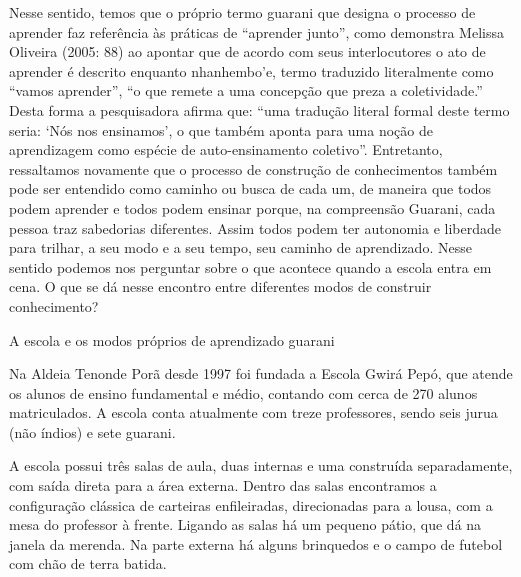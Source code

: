 \documentclass{article}
\begin{document}
Nesse sentido, temos que o pr\'oprio termo guarani que designa o
processo de aprender faz refer\^encia \`as pr\'aticas de
{\textquotedblleft}aprender junto{\textquotedblright}, como demonstra 
Melissa Oliveira (2005: 88) ao apontar que de acordo com seus
interlocutores o ato de aprender \'e descrito enquanto
nhanhembo{\textquoteright}e, termo traduzido literalmente como
{\textquotedblleft}vamos aprender{\textquotedblright},
{\textquotedblleft}o que remete a uma concep\c{c}\~ao que preza a
coletividade.{\textquotedblright} Desta forma a pesquisadora afirma
que: {\textquotedblleft}uma tradu\c{c}\~ao literal formal deste termo
seria: {\textquoteleft}N\'os nos ensinamos{\textquoteright}, o que
tamb\'em aponta para uma no\c{c}\~ao de aprendizagem como esp\'ecie de
auto-ensinamento coletivo{\textquotedblright}. Entretanto, ressaltamos
novamente que o processo de constru\c{c}\~ao de conhecimentos tamb\'em
pode ser entendido como caminho ou busca de cada um, de maneira que
todos podem aprender e todos podem ensinar porque, na compreens\~ao
Guarani, cada pessoa traz sabedorias diferentes. Assim todos podem ter
autonomia e liberdade para trilhar, a seu modo e a seu tempo, seu
caminho de aprendizado. Nesse sentido podemos nos perguntar sobre o que
acontece quando a escola entra em cena. O que se d\'a nesse encontro
entre diferentes modos de construir conhecimento?

A escola e os modos pr\'oprios de aprendizado guarani

Na Aldeia Tenonde Por\~a desde 1997 foi fundada a Escola Gwir\'a Pep\'o,
que atende os alunos de ensino fundamental e m\'edio, contando com
cerca de 270 alunos matriculados. A escola conta atualmente com treze
professores, sendo seis jurua (n\~ao \'indios) e sete guarani.

A escola possui tr\^es salas de aula, duas internas e uma constru\'ida
separadamente, com sa\'ida direta para a \'area externa. Dentro das
salas encontramos a configura\c{c}\~ao cl\'assica de carteiras
enfileiradas, direcionadas para a lousa, com a mesa do professor \`a
frente. Ligando as salas h\'a um pequeno p\'atio, que d\'a na janela da
merenda. Na parte externa h\'a alguns brinquedos e o campo de futebol
com ch\~ao de terra batida. 
\end{document}
